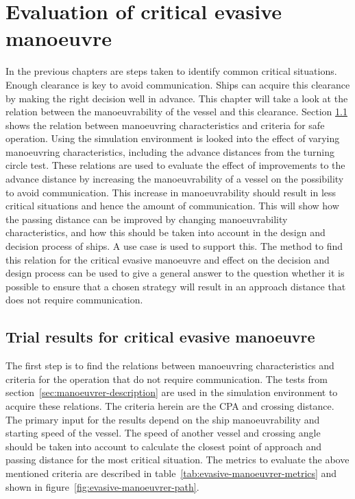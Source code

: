 \chapter{Evaluation of critical evasive manoeuvre}
In the previous chapters are steps taken to identify common critical situations. Enough clearance is key to avoid communication. Ships can acquire this clearance by making the right decision well in advance. This chapter will take a look at the relation between the manoeuvrability of the vessel and this clearance. Section \ref{sec:trial-result} shows the relation between manoeuvring characteristics and criteria for safe operation. Using the simulation environment is looked into the effect of varying manoeuvring characteristics, including the advance distances from the turning circle test.
These relations are used to evaluate the effect of improvements to the advance distance by increasing the manoeuvrability of a vessel on the possibility to avoid communication. This increase in manoeuvrability should result in less critical situations and hence the amount of communication. This will show how the passing distance can be improved by changing manoeuvrability characteristics, and how this should be taken into account in the design and decision process of ships. A use case is used to support this.
The method to find this relation for the critical evasive manoeuvre and effect on the decision and design process can be used to give a general answer to the question whether it is possible to ensure that a chosen strategy will result in an approach distance that does not require communication.

\section{Trial results for critical evasive manoeuvre}
\label{sec:trial-result}
The first step is to find the relations between manoeuvring characteristics and criteria for the operation that do not require communication. The tests from section~\ref{sec:manoeuvrer-description} are used in the simulation environment to acquire these relations. The criteria herein are the \ac{CPA} and crossing distance. The primary input for the results depend on the ship manoeuvrability and starting speed of the vessel. The speed of another vessel and crossing angle should be taken into account to calculate the closest point of approach and passing distance for the most critical situation. The metrics to evaluate the above mentioned criteria are described in table~\ref{tab:evasive-manoeuvrer-metrics} and shown in figure~\ref{fig:evasive-manoeuvrer-path}.

